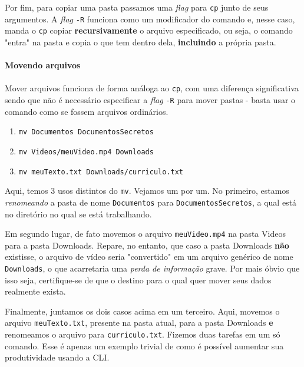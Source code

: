 \documentclass{article}
\begin{document}
	Por fim, para copiar uma pasta passamos uma \textit{flag} para \texttt{cp} junto de seus argumentos. 
	A \textit{flag} \texttt{-R} funciona como um modificador do comando e, nesse caso, manda o \texttt{cp}
	copiar \textbf{recursivamente} o arquivo especificado, ou seja, o comando "entra" na pasta e copia o que
	tem dentro dela, \textbf{incluindo} a própria pasta. 

	
	\paragraph{Movendo arquivos}
	\paragraph{}

	Mover arquivos funciona de forma análoga ao \texttt{cp}, com uma diferença significativa sendo que não é necessário 
	especificar a \textit{flag} \texttt{-R} para mover pastas - basta usar o comando como se fossem arquivos ordinários. 

	\begin{enumerate} 
		\item{\texttt{mv Documentos DocumentosSecretos}} 
		\item{\texttt{mv Videos/meuVideo.mp4 Downloads}} 
		\item{\texttt{mv meuTexto.txt Downloads/curriculo.txt}} 
	\end{enumerate} 

	Aqui, temos 3 usos distintos do \texttt{mv}. Vejamos um por um. No primeiro, estamos \textit{renomeando} a pasta de 
	nome \texttt{Documentos} para \texttt{DocumentosSecretos}, a qual está no diretório no qual se está trabalhando. 


	Em segundo lugar, de fato movemos o arquivo \texttt{meuVideo.mp4} na pasta Videos para a pasta Downloads. Repare, no 
	entanto, que caso a pasta Downloads \textbf{não} existisse, o arquivo de vídeo seria "convertido" em um arquivo 
	genérico de nome \texttt{Downloads}, o que acarretaria uma \textit{perda de informação} grave. Por mais óbvio que isso
	seja, certifique-se de que o destino para o qual quer mover seus dados realmente exista. 


	Finalmente, juntamos os dois casos acima em um terceiro. Aqui, movemos o arquivo \texttt{meuTexto.txt}, presente na pasta
	atual, para a pasta Downloads \textbf{e} renomeamos o arquivo para \texttt{curriculo.txt}. Fizemos duas tarefas em um 
	só comando. Esse é apenas um exemplo trivial de como é possível aumentar sua produtividade usando a CLI. 
	
\end{document}
